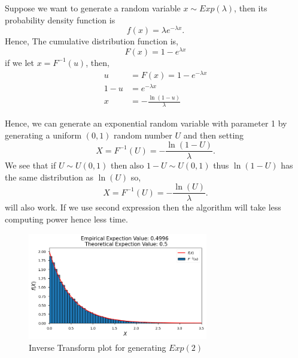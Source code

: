 \begin{example}
    Suppose we want to generate a random variable $x\sim Exp(\lambda)$, then its probability density function is 
    \[
    f(x) = \lambda e^{-\lambda x}.
    \] 
    Hence, The cumulative distribution function is,
    \[
    F(x) = 1-e^{\lambda x}
    \] 
    if we let $x=F^{-1}(u)$, then,
    \begin{align*}
        u&=F(x)=1-e^{-\lambda x} \\ 
         1-u &= e ^{-\lambda x}\\ 
         x &= - \frac{\ln(1-u)}{\lambda}
    \end{align*}
    
    Hence, we can generate an exponential random variable with parameter 1 by generating a uniform $(0,1)$ random number $U$ and then setting
    \[
    X = F^{-1}(U) = -\frac{\ln(1-U)}{\lambda}.
    \] 
    We see that if $U\sim U(0,1)$ then also $1-U\sim U(0,1)$ thus  $\ln(1-U)$ has the same distribution as  $\ln(U)$ so,
    \[
    X = F^{-1}(U) = -\frac{\ln(U)}{\lambda}.
    \] 
    will also work. If we use second expression then the algorithm will take less computing power hence less time.
    \begin{figure}[H]
        
        \centering
        \includegraphics[width=0.7\textwidth]{images/exp_ITA.png}
        \caption{Inverse Transform plot for generating $Exp(2)$}
    \end{figure}
\end{example}
